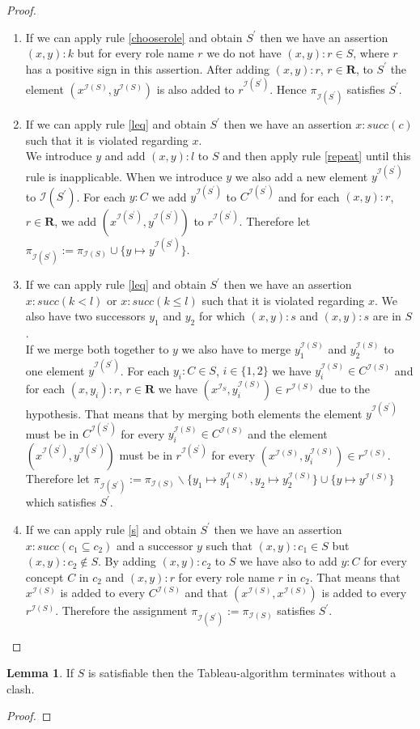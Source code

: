 \documentclass[a4paper,11pt]{scrartcl}
\theoremstyle{break}
\theoremstyle{definition}
\newtheorem{mylem}{Lemma}
\begin{document}
\begin{proof}
\begin{enumerate}
\item If we can apply rule \ref{chooserole} and obtain $S^\prime$ then we have an assertion $(x,y):k$ but for every role name $r$ we do not have $(x,y):r\in S$, where $r$ has a positive sign in this assertion. After adding $(x,y):r$, $r\in\mathbf{R}$, to $S^\prime$ the element $(x^{\mathcal{I}(S)},y^{\mathcal{I}(S)})$ is also added to $r^{\mathcal{I}(S^\prime)}$. Hence $\pi_{\mathcal{I}(S^\prime)}$ satisfies $S^\prime$.
\item If we can apply rule \ref{leq} and obtain $S^\prime$ then we have an assertion $x:succ(c)$ such that it is violated regarding $x$.\\
We introduce $y$ and add $(x,y):l$ to $S$ and then apply rule \ref{repeat} until this rule is inapplicable. When we introduce $y$ we also add a new element $y^{\mathcal{I}(S^\prime)}$ to $\mathcal{I}(S^\prime)$. For each $y:C$ we add $y^{\mathcal{I}(S^\prime)}$ to $C^{\mathcal{I}(S^\prime)}$ and for each $(x,y):r$, $r\in\mathbf{R}$, we add $(x^{\mathcal{I}(S^\prime)},y^{\mathcal{I}(S^\prime)})$ to $r^{\mathcal{I}(S^\prime)}$. Therefore let $\pi_{\mathcal{I}(S^\prime)}:=\pi_{\mathcal{I}(S)}\cup \{y\mapsto y^{\mathcal{I}(S^\prime)}\}$.
\item If we can apply rule \ref{leq} and obtain $S^\prime$ then we have an assertion $x:succ(k<l)$ or $x:succ(k\leq l)$ such that it is violated regarding $x$. We also have two successors $y_1$ and $y_2$ for which $(x,y):s$ and $(x,y):s$ are in $S$.\\
If we merge both together to $y$ we also have to merge $y_1^{\mathcal{I}(S)}$ and $y_2^{\mathcal{I}(S)}$ to one element $y^{\mathcal{I}(S^\prime)}$. For each $y_i:C\in S$, $i\in\{1,2\}$ we have $y_i^{\mathcal{I}(S)}\in C^{\mathcal{I}(S)}$ and for each $(x,y_i):r$, $r\in\mathbf{R}$ we have $(x^{\mathcal{I}_S},y_i^{\mathcal{I}(S)})\in r^{\mathcal{I}(S)}$ due to the hypothesis. That means that by merging both elements the element $y^{\mathcal{I}(S^\prime)}$ must be in $C^{\mathcal{I}(S^\prime)}$ for every $y_i^{\mathcal{I}(S)}\in C^{\mathcal{I}(S)}$ and the element $(x^{\mathcal{I}(S^\prime)},y^{\mathcal{I}(S^\prime)})$ must be in $r^{\mathcal{I}(S^\prime)}$ for every $(x^{\mathcal{I}(S)},y_i^{\mathcal{I}(S)})\in r^{\mathcal{I}(S)}$. Therefore let $\pi_{\mathcal{I}(S^\prime)}:=\pi_{\mathcal{I}(S)}\backslash\{y_1\mapsto y_1^{\mathcal{I}(S)}, y_2\mapsto y_2^{\mathcal{I}(S)}\}\cup\{y\mapsto y^{\mathcal{I}(S)}\}$ which satisfies $S^\prime$.
\item If we can apply rule \ref{s} and obtain $S^\prime$ then we have an assertion $x:succ(c_1\subseteq c_2)$ and a successor $y$ such that $(x,y):c_1\in S$ but $(x,y):c_2\notin S$. By adding $(x,y):c_2$ to $S$ we have also to add $y:C$ for every concept $C$ in $c_2$ and $(x,y):r$ for every role name $r$ in $c_2$. That means that $x^{\mathcal{I}(S)}$ is added to every $C^{\mathcal{I}(S)}$ and that $(x^{\mathcal{I}(S)},x^{\mathcal{I}(S)})$ is added to every $r^{\mathcal{I}(S)}$. Therefore the assignment $\pi_{\mathcal{I}(S^\prime)}:=\pi_{\mathcal{I}(S)}$ satisfies $S^\prime$.
\end{enumerate}
\end{proof}
\begin{mylem}
If $S$ is satisfiable then the Tableau-algorithm terminates without a clash.
\end{mylem}
\begin{proof}
\end{proof}
\fi
\normalem


\end{document}
